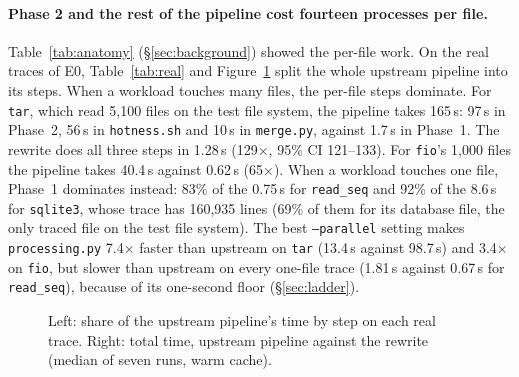 \paragraph{Phase 2 and the rest of the pipeline cost fourteen processes per file.}
Table~\ref{tab:anatomy} (\S\ref{sec:background}) showed the per-file work. On the
real traces of E0, Table~\ref{tab:real} and Figure~\ref{fig:breakdown} split the whole
upstream pipeline into its steps. When a workload touches many files, the per-file steps
dominate. For \texttt{tar}, which read 5{,}100 files on the test file system, the
pipeline takes 165\,s: 97\,s in Phase~2, 56\,s in \texttt{hotness.sh} and 10\,s in
\texttt{merge.py}, against 1.7\,s in Phase~1. The rewrite does all three steps in
1.28\,s (129$\times$, 95\% CI 121--133). For \texttt{fio}'s 1{,}000 files the pipeline
takes 40.4\,s against 0.62\,s (65$\times$). When a workload touches one file, Phase~1
dominates instead: 83\% of the 0.75\,s for \texttt{read\_seq} and 92\% of the 8.6\,s
for \texttt{sqlite3}, whose trace has 160{,}935 lines (69\% of them for its database
file, the only traced file on the test file system). The
best \texttt{--parallel} setting makes
\texttt{processing.py} 7.4$\times$ faster than upstream on \texttt{tar} (13.4\,s against
98.7\,s) and 3.4$\times$ on \texttt{fio}, but slower than upstream on every one-file
trace (1.81\,s against 0.67\,s for \texttt{read\_seq}), because of its one-second floor
(\S\ref{sec:ladder}).

\begin{table}[t]
\caption{Real traces, warm cache: wall time (s, median of seven runs) of upstream
\texttt{processing.py} (a), the best \texttt{--parallel} setting (d), the rewrite (c),
and of the whole pipeline (\texttt{processing.py}, \texttt{merge.py},
\texttt{hotness.sh}) against the rewrite doing all three steps.}
\label{tab:real}
\small
\centering
{}
\end{table}

\begin{figure}[t]
\centering
{}
\caption{Left: share of the upstream pipeline's time by step on each real trace. Right:
total time, upstream pipeline against the rewrite (median of seven runs, warm cache).}
\label{fig:breakdown}
\end{figure}
